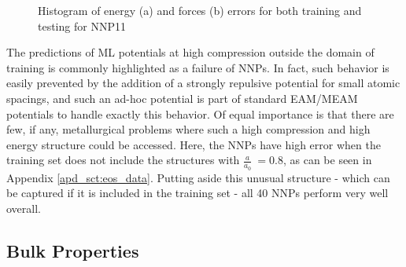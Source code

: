 \documentclass{article}
\begin{document}
\begin{figure}[H]%
\centering%
%
%
\caption{Histogram of energy (a) and forces (b) errors for both training and testing for NNP11}
\label{fig:rsme_histogram}
\end{figure}

The predictions of ML potentials at high compression outside the domain of training is commonly highlighted as a failure of NNPs.
In fact, such behavior is easily prevented by the addition of a strongly repulsive potential for small atomic spacings, and such an ad-hoc potential is part of standard EAM/MEAM potentials to handle exactly this behavior.
Of equal importance is that there are few, if any, metallurgical problems where such a high compression and high energy structure could be accessed.  Here, the NNPs have high error when the training set does not include the structures with $\frac{a}{a_0} ~= 0.8$, as can be seen in Appendix \ref{apd_sct:eos_data}. Putting aside this unusual structure - which can be captured if it is included in the training set - all 40 NNPs perform very well overall.


\subsection{Bulk Properties} \label{sct:bulk_properties}
\end{document}
